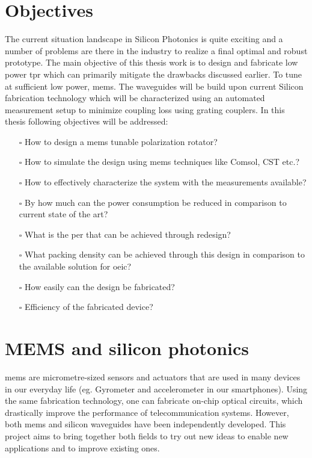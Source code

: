 \documentclass[../report.tex]{subfiles}
\begin{document}
	\section{Objectives}
The current situation landscape in Silicon Photonics is quite exciting and a number of problems are there in the industry to realize a final optimal and robust prototype. The main objective of this thesis work is to design and fabricate low power \gls{tpr} which can primarily mitigate the drawbacks discussed earlier. To tune at sufficient low power, \gls{mems}. The waveguides will be build upon current Silicon fabrication technology which will be characterized using an automated measurement setup to minimize coupling loss using grating couplers. In this thesis following objectives will be addressed:
\begin{itemize}
	\item[$\square$] How to design a \gls{mems} tunable polarization rotator?
	\item[$\square$] How to simulate the design using \gls{mems} techniques like Comsol, CST etc.?
	\item[$\square$] How to effectively characterize the system with the measurements available?
	\item[$\square$] By how much can the power consumption be reduced in comparison to current state of the art?
	\item[$\square$] What is the \gls{per} that can be achieved through redesign?
	\item[$\square$] What packing density can be achieved through this design in comparison to the available solution for \gls{oeic}?
	\item[$\square$] How easily can the design be fabricated?
	\item[$\square$] Efficiency of the fabricated device?
\end{itemize}

	\section{MEMS and silicon photonics}
\gls{mems} are micrometre-sized sensors and actuators that are used in many devices in our everyday life (eg. Gyrometer and accelerometer in our smartphones). Using the same fabrication technology, one can fabricate on-chip optical circuits, which drastically improve the performance of telecommunication systems. However, both \gls{mems} and silicon waveguides have been independently developed. This project aims to bring together both fields to try out new ideas to enable new applications and to improve existing ones. 
	
\end{document}
